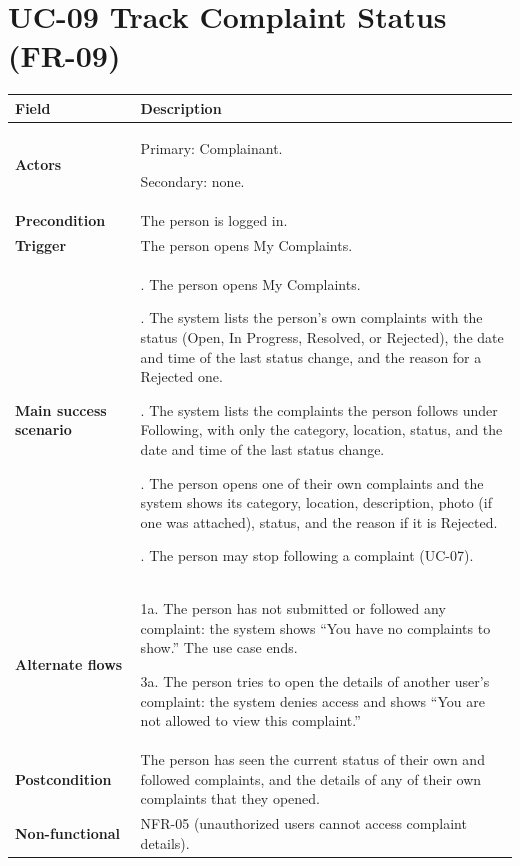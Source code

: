 \documentclass[11pt,a4paper]{report}
\begin{document}
\section{UC-09 Track Complaint Status (FR-09)}
\begin{longtable}{|>{\raggedright\arraybackslash}p{3.0cm}|>{\raggedright\arraybackslash}p{12.4cm}|}
\hline \textbf{Field} & \textbf{Description} \\ \hline \endhead
\textbf{Actors} & Primary: Complainant.\par\smallskip Secondary: none. \\ \hline
\textbf{Precondition} & The person is logged in. \\ \hline
\textbf{Trigger} & The person opens My Complaints. \\ \hline
\textbf{Main success scenario} & 1. The person opens My Complaints.\par\smallskip 2. The system lists the person's own complaints with the status (Open, In Progress, Resolved, or Rejected), the date and time of the last status change, and the reason for a Rejected one.\par\smallskip 3. The system lists the complaints the person follows under Following, with only the category, location, status, and the date and time of the last status change.\par\smallskip 4. The person opens one of their own complaints and the system shows its category, location, description, photo (if one was attached), status, and the reason if it is Rejected.\par\smallskip 5. The person may stop following a complaint (UC-07). \\ \hline
\textbf{Alternate flows} & 1a. The person has not submitted or followed any complaint: the system shows ``You have no complaints to show.'' The use case ends.\par\smallskip 3a. The person tries to open the details of another user's complaint: the system denies access and shows ``You are not allowed to view this complaint.'' \\ \hline
\textbf{Postcondition} & The person has seen the current status of their own and followed complaints, and the details of any of their own complaints that they opened. \\ \hline
\textbf{Non-functional} & NFR-05 (unauthorized users cannot access complaint details). \\ \hline
\end{longtable}
\end{document}
